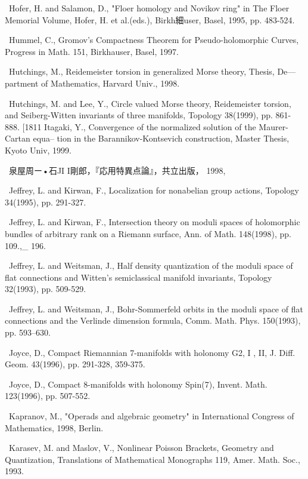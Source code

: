 {\noindent [183]\ Hofer, H. and Salamon, D., "Floer homology and Novikov ring" in The Floer Memorial Volume, Hofer, H. et al.(eds.), Birkh細user, Basel, 1995, pp. 483-524.\par\smallskip
\noindent [184]\ Hummel, C., Gromov's Compactness Theorem for Pseudo-holomorphic Curves, Progress in Math. 151, Birkhauser, Basel, 1997.\par\smallskip
\noindent [185]\ Hutchings, M., Reidemeister torsion in generalized Morse theory, Thesis, De— partment of Mathematics, Harvard Univ., 1998.\par\smallskip
\noindent [186]\ Hutchings, M. and Lee, Y., Circle valued Morse theory, Reidemeister torsion, and Seiberg-Witten invariants of three manifolds, Topology 38(1999), pp. 861-888. [1811 Itagaki, Y., Convergence of the normalized solution of the Maurer-Cartan equa-- tion in the Barannikov-Kontsevich construction, Master Thesis, Kyoto Univ, 1999.\par\smallskip
\noindent [188]\ 泉屋周ー•石JI I剛郎，『応用特異点論』，共立出版， 1998,\par\smallskip
\noindent [189]\ Jeffrey, L. and Kirwan, F., Localization for nonabelian group actions, Topology 34(1995), pp. 291-327.\par\smallskip
\noindent [190]\ Jeffrey, L. and Kirwan, F., Intersection theory on moduli spaces of holomorphic bundles of arbitrary rank on a Riemann surface, Ann. of Math. 148(1998), pp. 109.,\_ 196.\par\smallskip
\noindent [191]\ Jeffrey, L. and Weitsman, J., Half density quantization of the moduli space of flat connections and Witten's semiclassical manifold invariants, Topology 32(1993), pp. 509-529.\par\smallskip
\noindent [192]\ Jeffrey, L. and Weitsman, J., Bohr-Sommerfeld orbits in the moduli space of flat connections and the Verlinde dimension formula, Comm. Math. Phys. 150(1993), pp. 593--630.\par\smallskip
\noindent [193]\ Joyce, D., Compact Riemannian 7-manifolds with holonomy G2, I , II, J. Diff. Geom. 43(1996), pp. 291-328, 359-375.\par\smallskip
\noindent [194]\ Joyce, D., Compact 8-manifolds with holonomy Spin(7), Invent. Math. 123(1996), pp. 507-552.\par\smallskip
\noindent [195]\ Kapranov, M., "Operads and algebraic geometry" in International Congress of Mathematics, 1998, Berlin.\par\smallskip
\noindent [196]\ Karasev, M. and Maslov, V., Nonlinear Poisson Brackets, Geometry and Quantization, Translations of Mathematical Monographs 119, Amer. Math. Soc., 1993.\par\smallskip
}
